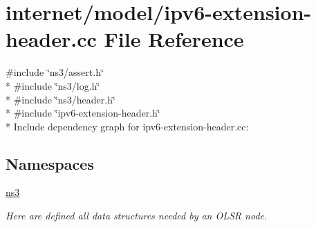 \hypertarget{ipv6-extension-header_8cc}{}\section{internet/model/ipv6-\/extension-\/header.cc File Reference}
\label{ipv6-extension-header_8cc}
{\ttfamily \#include \char`\"{}ns3/assert.\+h\char`\"{}}\\*
{\ttfamily \#include \char`\"{}ns3/log.\+h\char`\"{}}\\*
{\ttfamily \#include \char`\"{}ns3/header.\+h\char`\"{}}\\*
{\ttfamily \#include \char`\"{}ipv6-\/extension-\/header.\+h\char`\"{}}\\*
Include dependency graph for ipv6-\/extension-\/header.cc\+:
\subsection*{Namespaces}
\begin{DoxyCompactItemize}
\item 
 \hyperlink{namespacens3}{ns3}
\begin{DoxyCompactList}\small\item\em Here are defined all data structures needed by an O\+L\+SR node. \end{DoxyCompactList}\end{DoxyCompactItemize}
